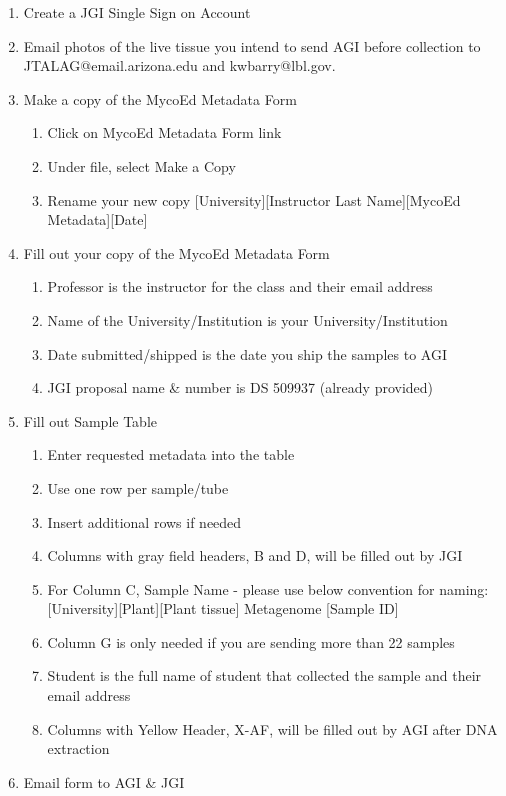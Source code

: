 \documentclass[
  letterpaper,
  DIV=11,
  numbers=noendperiod]{scrreprt}
\providecommand{\tightlist}{%
  \setlength{\itemsep}{0pt}\setlength{\parskip}{0pt}}
\begin{document}
\begin{enumerate}
\def\labelenumi{\arabic{enumi}.}
\tightlist
\item
  Create a JGI Single Sign on Account
\item
  Email photos of the live tissue you intend to send AGI before
  collection to JTALAG@email.arizona.edu and kwbarry@lbl.gov.
\item
  Make a copy of the MycoEd Metadata Form

  \begin{enumerate}
  \def\labelenumii{\alph{enumii}.}
  \tightlist
  \item
    Click on MycoEd Metadata Form link
  \item
    Under file, select Make a Copy
  \item
    Rename your new copy {[}University{]}{[}Instructor Last
    Name{]}{[}MycoEd Metadata{]}{[}Date{]}
  \end{enumerate}
\item
  Fill out your copy of the MycoEd Metadata Form

  \begin{enumerate}
  \def\labelenumii{\alph{enumii}.}
  \tightlist
  \item
    Professor is the instructor for the class and their email address
  \item
    Name of the University/Institution is your University/Institution
  \item
    Date submitted/shipped is the date you ship the samples to AGI
  \item
    JGI proposal name \& number is DS 509937 (already provided)
  \end{enumerate}
\item
  Fill out Sample Table

  \begin{enumerate}
  \def\labelenumii{\alph{enumii}.}
  \tightlist
  \item
    Enter requested metadata into the table
  \item
    Use one row per sample/tube
  \item
    Insert additional rows if needed
  \item
    Columns with gray field headers, B and D, will be filled out by JGI
  \item
    For Column C, Sample Name - please use below convention for naming:
    {[}University{]}{[}Plant{]}{[}Plant tissue{]} Metagenome {[}Sample
    ID{]}
  \item
    Column G is only needed if you are sending more than 22 samples
  \item
    Student is the full name of student that collected the sample and
    their email address
  \item
    Columns with Yellow Header, X-AF, will be filled out by AGI after
    DNA extraction
  \end{enumerate}
\item
  Email form to AGI \& JGI


\end{enumerate}
\end{document}

